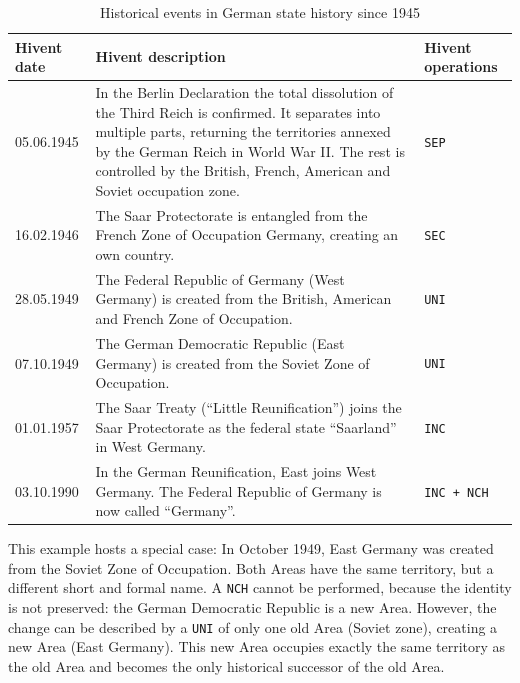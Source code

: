 \begin{table}[ht]
\begin{center}
\begin{tabular}{l p{8.8cm} l}
  \toprule
  Hivent date & Hivent description & Hivent operations \\
  \midrule

    05.06.1945
  & \normalsize{In the Berlin Declaration the total dissolution of the Third Reich is confirmed. It separates into multiple parts, returning the territories annexed by the German Reich in World War II. The rest is controlled by the British, French, American and Soviet occupation zone.}
  & \texttt{SEP} \\[1.5em]

    16.02.1946
  & \normalsize{The Saar Protectorate is entangled from the French Zone of Occupation Germany, creating an own country.}
  & \texttt{SEC} \\[1.5em]

    28.05.1949
  & \normalsize{The Federal Republic of Germany (West Germany) is created from the British, American and French Zone of Occupation.}
  & \texttt{UNI} \\[1.5em]

    07.10.1949
  & \normalsize{The German Democratic Republic (East Germany) is created from the Soviet Zone of Occupation.}
  & \texttt{UNI} \\[1.5em]

    01.01.1957
  & \normalsize{The Saar Treaty (``Little Reunification'') joins the Saar Protectorate as the federal state ``Saarland'' in West Germany.}
  & \texttt{INC} \\[1.5em]

    03.10.1990
  & \normalsize{In the German Reunification, East joins West Germany. The Federal Republic of Germany is now called ``Germany''.}
  & \texttt{INC + NCH} \\[1.5em]

  \bottomrule
\end{tabular}
\caption{Historical events in German state history since 1945}
\label{tab:german_history_since_1945}
\end{center}
\end{table}

This example hosts a special case: In October 1949, East Germany was created from the Soviet Zone of Occupation. Both Areas have the same territory, but a different short and formal name. A \texttt{NCH} cannot be performed, because the identity is not preserved: the German Democratic Republic is a new Area. However, the change can be described by a \texttt{UNI} of only one old Area (Soviet zone), creating a new Area (East Germany). This new Area occupies exactly the same territory as the old Area and becomes the only historical successor of the old Area.

